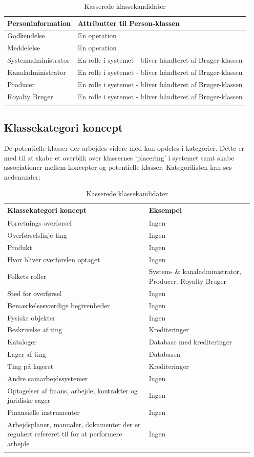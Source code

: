\begin{longtable}{|p{6cm}|p{10cm}|}
Personinformation &  Attributter til Person-klassen\\
\hline
Godkendelse & En operation \\
\hline
Meddelelse & En operation \\
\hline
Systemadministrator & En rolle i systemet - bliver håndteret af Bruger-klassen \\
\hline
Kanaladministrator & En rolle i systemet - bliver håndteret af Bruger-klassen \\
\hline 
Producer & En rolle i systemet - bliver håndteret af Bruger-klassen \\
\hline
Royalty Bruger & En rolle i systemet - bliver håndteret af Bruger-klassen \\
\hline
\caption{Kasserede klassekandidater}
\label{table:deleted_class_candidates}
\end{longtable}


\subsection{Klassekategori koncept}
De potentielle klasser der arbejdes videre med kan opdeles i kategorier. Dette er med til at skabe et overblik over klassernes ‘placering’ i systemet samt skabe associationer mellem koncepter og potentielle klasser. Kategorilisten kan ses nedenunder:

\begin{longtable}{|p{6cm}|p{10cm}|}
\hline
\textbf{Klassekategori koncept} & \textbf{Eksempel} \\
\hline
Forretnings overførsel & Ingen\\
\hline
Overførselslinje ting & Ingen\\
\hline
Produkt & Ingen \\
\hline
Hvor bliver overførslen optaget  & Ingen \\
\hline
Folkets roller & System- \& kanaladministrator, Producer, Royalty Bruger\\
\hline
Sted for overførsel & Ingen \\
\hline
Bemærkelsesværdige begivenheder & Ingen \\
\hline
Fysiske objekter & Ingen \\
\hline
Beskrivelse af ting & Krediteringer\\
\hline
Kataloger & Database med krediteringer\\
\hline
Lager af ting & Databasen\\
\hline
Ting på lageret & Krediteringer\\
\hline
Andre samarbejdssystemer & Ingen\\
\hline
Optagelser af finans, arbejde, kontrakter og juridiske sager &  Ingen \\
\hline
Finansielle instrumenter & Ingen\\
\hline
Arbejdsplaner, manualer, dokumenter der er regulært refereret til for at performere arbejde & Ingen\\
\hline
\caption{Kasserede klassekandidater}
\label{table:class_categories}
\end{longtable}


